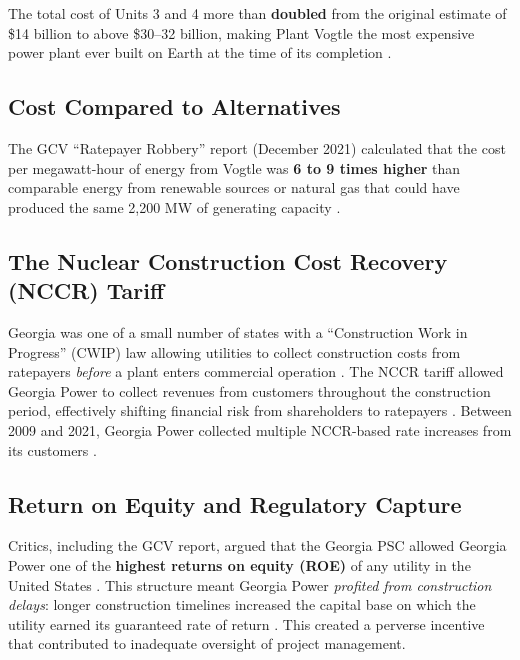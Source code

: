 \documentclass[12pt,a4paper]{article}
\begin{document}
The total cost of Units 3 and 4 more than \textbf{doubled} from the original estimate
of \$14 billion to above \$30--32 billion, making Plant Vogtle the most expensive
power plant ever built on Earth at the time of its completion \cite{gcv_ratepayer,schlissel_ieefa}.

\subsection{Cost Compared to Alternatives}

The GCV ``Ratepayer Robbery'' report (December 2021) calculated that the cost per
megawatt-hour of energy from Vogtle was \textbf{6 to 9 times higher} than comparable
energy from renewable sources or natural gas that could have produced the same
2,200 MW of generating capacity \cite{gcv_ratepayer}.

\subsection{The Nuclear Construction Cost Recovery (NCCR) Tariff}

Georgia was one of a small number of states with a ``Construction Work in Progress''
(CWIP) law allowing utilities to collect construction costs from ratepayers \textit{before}
a plant enters commercial operation \cite{gcv_ratepayer}. The NCCR tariff allowed Georgia Power to
collect revenues from customers throughout the construction period, effectively
shifting financial risk from shareholders to ratepayers \cite{gcv_ratepayer}. Between 2009 and 2021,
Georgia Power collected multiple NCCR-based rate increases from its customers \cite{gcv_ratepayer}.

\subsection{Return on Equity and Regulatory Capture}

Critics, including the GCV report, argued that the Georgia PSC allowed Georgia Power
one of the \textbf{highest returns on equity (ROE)} of any utility in the United States \cite{gcv_ratepayer}.
This structure meant Georgia Power \textit{profited from construction delays}: longer
construction timelines increased the capital base on which the utility earned its
guaranteed rate of return \cite{gcv_ratepayer}. This created a perverse incentive that contributed to
inadequate oversight of project management.

\end{document}

